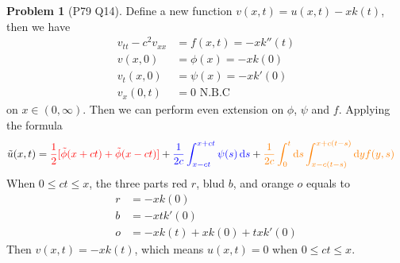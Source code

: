 \documentclass[twoside,11pt]{article}
\renewcommand*\d{\mathop{}\!\mathrm{d}}
\theoremstyle{definition}
\newtheorem{problem}{Problem}
\theoremstyle{remark}
\begin{document}
\begin{problem}[P79 Q14]
Define a new function $v(x,t) = u(x,t) - xk(t)$, then we have
\begin{align*}
    v_{tt} - c^2v_{xx} &= f(x, t) = - xk''(t)\\
    v(x, 0) &= \phi(x) = -xk(0)\\
    v_t(x,0) &= \psi(x) = -xk'(0)\\
    v_x(0, t) &= 0\text{\ N.B.C}
\end{align*}
on $x\in (0, \infty)$.
Then we can perform even extension on $\phi$, $\psi$ and $f$.
Applying the formula
\begin{align*}
    \tilde{u}(x, t) &= {\color{red} \frac{1}{2}[\tilde{\phi}(x+ct) + \tilde{\phi}(x-ct)]}
    + {\color{blue} \frac{1}{2c}\int_{x-ct}^{x+ct} \psi(s)\d s}
    + {\color{orange} \frac{1}{2c}\int_0^t\d s \int_{x-c(t-s)}^{x+c(t-s)}\d y f(y, s)}
\end{align*}
When $0\leq ct\leq x$, the three parts red $r$, blud $b$, and orange $o$ equals to
\begin{align*}
    r &= -xk(0)\\
    b &= -xtk'(0)\\
    o &= -xk(t) + xk(0) + txk'(0)
\end{align*}
Then $v(x, t) = -xk(t)$, which means $u(x, t) = 0$ when $0\leq ct\leq x$.


\end{problem}
\end{document}
